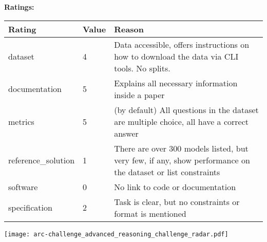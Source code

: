 {{{\bf Ratings:} ~ \\

\begin{tabular}{p{} p{} p{}}
\hline
Rating & Value & Reason \\
\hline
dataset & 4 & Data accessible, offers instructions on how to download the data via CLI tools. No splits.
 \\
documentation & 5 & Explains all necessary information inside a paper
 \\
metrics & 5 & (by default) All questions in the dataset are multiple choice, all have a correct answer
 \\
reference\_solution & 1 & There are over 300 models listed, but very few, if any, show performance on the dataset or list constraints
 \\
software & 0 & No link to code or documentation
 \\
specification & 2 & Task is clear, but no constraints or format is mentioned
 \\
\hline
\end{tabular}

\texttt{[image: arc-challenge\_advanced\_reasoning\_challenge\_radar.pdf]}
}}
\clearpage